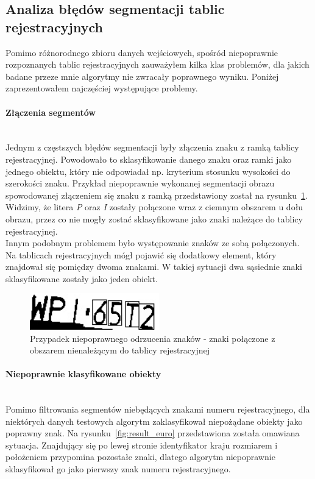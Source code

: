 \subsection{Analiza błędów segmentacji tablic rejestracyjnych}
Pomimo różnorodnego zbioru danych wejściowych, spośród niepoprawnie rozpoznanych tablic rejestracyjnych zauważyłem kilka klas problemów, dla jakich badane przeze mnie algorytmy nie zwracały poprawnego wyniku. Poniżej zaprezentowałem najczęściej występujące problemy.
\paragraph{Złączenia segmentów}\mbox{} \\
Jednym z częstszych błędów segmentacji były złączenia znaku z ramką tablicy rejestracyjnej. Powodowało to sklasyfikowanie danego znaku oraz ramki jako jednego obiektu, który nie odpowiadał np. kryterium stosunku wysokości do szerokości znaku. Przykład niepoprawnie wykonanej segmentacji obrazu spowodowanej złączeniem się znaku z ramką przedstawiony został na rysunku~\ref{fig:polaczone_krawedzie}. Widzimy, że litera \textit{P} oraz \textit{I} zostały połączone wraz z ciemnym obszarem u dołu obrazu, przez co nie mogły zostać sklasyfikowane jako znaki należące do tablicy rejestracyjnej. \\
Innym podobnym problemem było występowanie znaków ze sobą połączonych. Na tablicach rejestracyjnych mógł pojawić się dodatkowy element, który znajdował się pomiędzy dwoma znakami. W takiej sytuacji dwa sąsiednie znaki sklasyfikowane zostały jako jeden obiekt. 
\begin{figure}
  \centering
  \includegraphics[width=0.5\textwidth]{img/polaczone-krawedzie}
  \caption{Przypadek niepoprawnego odrzucenia znaków - znaki połączone z obszarem nienależącym do tablicy rejestracyjnej}
  \label{fig:polaczone_krawedzie}
\end{figure}

\paragraph{Niepoprawnie klasyfikowane obiekty}\mbox{} \\
Pomimo filtrowania segmentów niebędących znakami numeru rejestracyjnego, dla niektórych danych testowych algorytm zaklasyfikował niepożądane obiekty jako poprawny znak. Na rysunku~\ref{fig:result_euro} przedstawiona została omawiana sytuacja. Znajdujący się po lewej stronie identyfikator kraju rozmiarem i położeniem przypomina pozostałe znaki, dlatego algorytm niepoprawnie sklasyfikował go jako pierwszy znak numeru rejestracyjnego.

